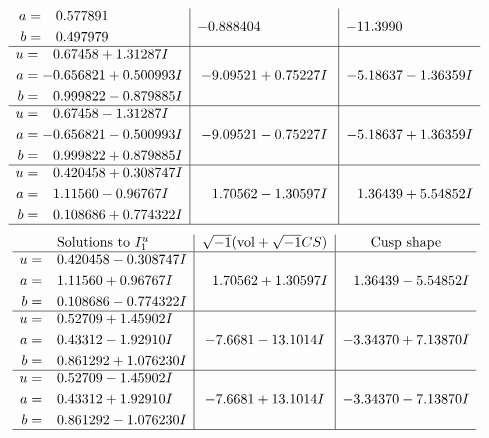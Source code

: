 \documentclass[1p]{elsarticle_modified}
\theoremstyle{definition}
\newcommand{\I}{\sqrt{-1}}
\begin{document}
$$\begin{array}{c|c|c}
\begin{aligned}
a &= \phantom{-}0.577891\phantom{ +0.000000I} \\
b &= \phantom{-}0.497979\phantom{ +0.000000I}\end{aligned}
 & -0.888404\phantom{ +0.000000I} & -11.3990\phantom{ +0.000000I} \\ \hline\begin{aligned}
u &= \phantom{-}0.67458 + 1.31287 I \\
a &= -0.656821 + 0.500993 I \\
b &= \phantom{-}0.999822 - 0.879885 I\end{aligned}
 & -9.09521 + 0.75227 I & -5.18637 - 1.36359 I \\ \hline\begin{aligned}
u &= \phantom{-}0.67458 - 1.31287 I \\
a &= -0.656821 - 0.500993 I \\
b &= \phantom{-}0.999822 + 0.879885 I\end{aligned}
 & -9.09521 - 0.75227 I & -5.18637 + 1.36359 I \\ \hline\begin{aligned}
u &= \phantom{-}0.420458 + 0.308747 I \\
a &= \phantom{-}1.11560 - 0.96767 I \\
b &= \phantom{-}0.108686 + 0.774322 I\end{aligned}
 & \phantom{-}1.70562 - 1.30597 I & \phantom{-}1.36439 + 5.54852 I\\
 \hline 
 \end{array}$$\newpage$$\begin{array}{c|c|c}  
\text{Solutions to }I^u_{1}& \I (\text{vol} + \sqrt{-1}CS) & \text{Cusp shape}\\
 \hline 
\begin{aligned}
u &= \phantom{-}0.420458 - 0.308747 I \\
a &= \phantom{-}1.11560 + 0.96767 I \\
b &= \phantom{-}0.108686 - 0.774322 I\end{aligned}
 & \phantom{-}1.70562 + 1.30597 I & \phantom{-}1.36439 - 5.54852 I \\ \hline\begin{aligned}
u &= \phantom{-}0.52709 + 1.45902 I \\
a &= \phantom{-}0.43312 - 1.92910 I \\
b &= \phantom{-}0.861292 + 1.076230 I\end{aligned}
 & -7.6681 - 13.1014 I & -3.34370 + 7.13870 I \\ \hline\begin{aligned}
u &= \phantom{-}0.52709 - 1.45902 I \\
a &= \phantom{-}0.43312 + 1.92910 I \\
b &= \phantom{-}0.861292 - 1.076230 I\end{aligned}
 & -7.6681 + 13.1014 I & -3.34370 - 7.13870 I\\
 \hline 
 \end{array}$$\newpage\newpage\renewcommand{\arraystretch}{1}
\end{document}
